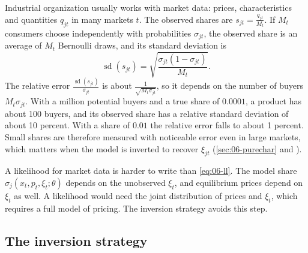 Industrial organization usually works with market data: prices, characteristics and quantities $q_{jt}$ in many
markets $t$. The observed shares are $s_{jt} = \frac{q_{jt}}{M_t}$. If $M_t$ consumers choose independently with
probabilities $\sigma_{jt}$, the observed share is an average of $M_t$ Bernoulli draws, and its standard deviation
is
\begin{equation}\label{eq:06-samplingerror}
\operatorname{sd}(s_{jt}) = \sqrt{\frac{\sigma_{jt}(1 - \sigma_{jt})}{M_t}} .
\end{equation}
The relative error $\frac{\operatorname{sd}(s_{jt})}{\sigma_{jt}}$ is about $\frac{1}{\sqrt{M_t\sigma_{jt}}}$, so it
depends on the number of buyers $M_t\sigma_{jt}$. With a million potential buyers and a true share of $0.0001$, a
product has about 100 buyers, and its observed share has a relative standard deviation of about 10 percent. With
a share of $0.01$ the relative error falls to about 1 percent. Small shares are therefore measured with
noticeable error even in large markets, which matters when the model is inverted to recover $\xi_{jt}$
(\cref{sec:06-purechar} and \citealp{BerryLintonPakes2004}).

A likelihood for market data is harder to write than \eqref{eq:06-ll}. The model share
$\sigma_j(x_t, p_t, \xi_t; \theta)$ depends on the unobserved $\xi_t$, and equilibrium prices depend on $\xi_t$ as
well. A likelihood would need the joint distribution of prices and $\xi_t$, which requires a full model of
pricing. The inversion strategy avoids this step.

\subsection{The inversion strategy}\label{sec:06-inversion-idea}

